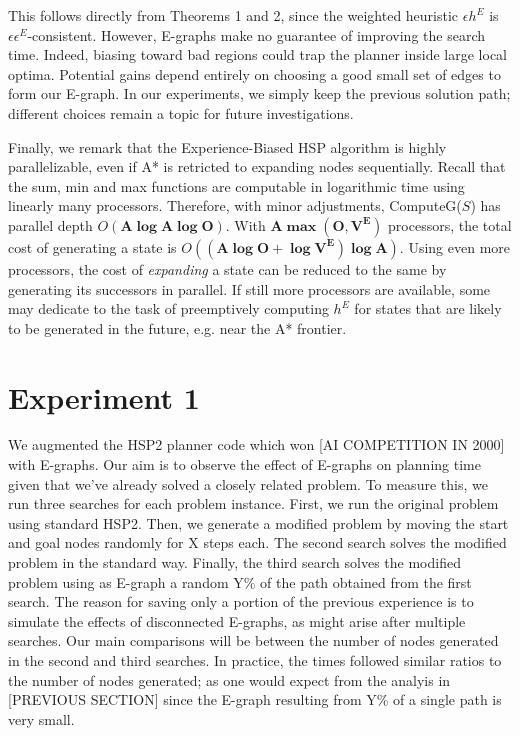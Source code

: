 \documentclass[letterpaper]{article}
\begin{document}
This follows directly from Theorems 1 and 2, since the weighted heuristic $\epsilon h^E$ is $\epsilon \epsilon^E$-consistent.
However, E-graphs make no guarantee of improving the search time. Indeed, biasing toward bad regions could trap the planner inside large local optima.
Potential gains depend entirely on choosing a good small set of edges to form our E-graph.
In our experiments, we simply keep the previous solution path; different choices remain a topic for future investigations.

Finally, we remark that the Experience-Biased HSP algorithm is highly parallelizable, even if A* is retricted to expanding nodes sequentially. Recall that the sum, min and max functions are computable in logarithmic time using linearly many processors. Therefore, with minor adjustments, ComputeG($S$) has parallel depth $O(\mathbf{A\log A\log O})$. With $\mathbf{A\max(O,V^E)}$ processors, the total cost of generating a state is $O(\mathbf{(A\log O + \log V^E)\log A})$. Using even more processors, the cost of \textit{expanding} a state can be reduced to the same by generating its successors in parallel. If still more processors are available, some may dedicate to the task of preemptively computing $h^E$ for states that are likely to be generated in the future, e.g. near the A* frontier.

\section{Experiment 1}

We augmented the HSP2 planner code \cite{bonet2001planning} which won [AI COMPETITION IN 2000] with E-graphs. Our aim is to observe the effect of E-graphs on planning time given that we've already solved a closely related problem. To measure this, we run three searches for each problem instance. First, we run the original problem using standard HSP2. Then, we generate a modified problem by moving the start and goal nodes randomly for X steps each. The second search solves the modified problem in the standard way. Finally, the third search solves the modified problem using as E-graph a random Y\% of the path obtained from the first search. The reason for saving only a portion of the previous experience is to simulate the effects of disconnected E-graphs, as might arise after multiple searches. Our main comparisons will be between the number of nodes generated in the second and third searches. In practice, the times followed similar ratios to the number of nodes generated; as one would expect from the analyis in [PREVIOUS SECTION] since the E-graph resulting from Y\% of a single path is very small.
\end{document}
